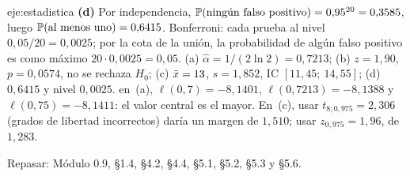\begin{solucion}{eje:estadistica}
\noindent\textbf{(d)} Por independencia, $\mathbb{P}(\text{ningún falso positivo})=0{,}95^{20}=0{,}3585$, luego $\mathbb{P}(\text{al menos uno})=0{,}6415$. Bonferroni: cada prueba al nivel $0{,}05/20=0{,}0025$; por la cota de la unión, la probabilidad de algún falso positivo es como máximo $20\cdot0{,}0025=0{,}05$.
\resultado (a) $\widehat\alpha=1/(2\ln2)=0{,}7213$; (b) $z=1{,}90$, $p=0{,}0574$, no se rechaza $H_0$; (c) $\bar{x}=13$, $s=1{,}852$, IC $[11{,}45;\ 14{,}55]$; (d) $0{,}6415$ y nivel $0{,}0025$.
\comprobacion en~(a), $\ell(0{,}7)=-8{,}1401$, $\ell(0{,}7213)=-8{,}1388$ y $\ell(0{,}75)=-8{,}1411$: el valor central es el mayor. En~(c), usar $t_{8;0{,}975}=2{,}306$ (grados de libertad incorrectos) daría un margen de $1{,}510$; usar $z_{0{,}975}=1{,}96$, de $1{,}283$.


\noindent Repasar: Módulo 0.9, §1.4, §4.2, §4.4, §5.1, §5.2, §5.3 y §5.6.
\end{solucion}
